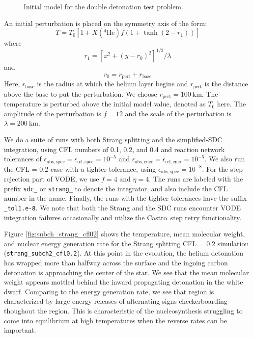 \documentclass[linenumbers]{aastex631}
\newcommand{\castro}{{\sf Castro}}
\newcommand{\isotm}[2]{{}^{#2}\mathrm{#1}}
\newcommand{\atolspec}{{\epsilon_\mathrm{abs,spec}}}
\newcommand{\rtolspec}{{\epsilon_\mathrm{rel,spec}}}
\newcommand{\atolener}{{\epsilon_\mathrm{abs,ener}}}
\newcommand{\rtolener}{{\epsilon_\mathrm{rel,ener}}}
\begin{document}
\begin{figure}[t]
\centering
{}
\caption{\label{fig:subch_initial_model} Initial model for the double detonation test problem.}
\end{figure}

An initial perturbation is placed on the symmetry axis of the form:
\begin{equation}
  T = T_0 \left [ 1 + X(\isotm{He}{4}) f (1 + \tanh(2 - r_1)) \right ]
\end{equation}
where
\begin{equation}
  r_1 = \left [ x^2 + (y - r_0)^2 \right ]^{1/2} / \lambda
\end{equation}
and
\begin{equation}
  r_0 = r_\mathrm{pert} + r_\mathrm{base}
\end{equation}
Here, $r_\mathrm{base}$ is the radius at which the helium layer begins
and $r_\mathrm{pert}$ is the distance above the base to put the perturbation.  We
choose $r_\mathrm{pert} = 100~\mathrm{km}$.  The temperature is perturbed above
the initial model value, denoted as $T_0$ here.  The amplitude of the perturbation
is $f = 12$ and the scale of the perturbation is $\lambda = 200~\mathrm{km}$.


We do a suite of runs with both Strang splitting and the simplified-SDC integration, using
CFL numbers of 0.1, 0.2, and 0.4 and reaction network tolerances of $\atolspec =
\rtolspec = 10^{-5}$ and $\atolener = \rtolener = 10^{-5}$.  We also run the CFL
= 0.2 case with a tighter tolerance, using  $\atolspec = 10^{-8}$.  For the step
rejection part of VODE, we use $f = 4$ and $\eta = 4$.  The runs are labeled with
the prefix {\tt sdc\_} or {\tt strang\_} to denote the integrator, and also include
the CFL number in the name.  Finally, the runs with the tighter tolerances have
the suffix {\tt \_tol1.e-8}.  We note that both the Strang and the SDC runs encounter
VODE integration failures occasionally and utilize the \castro\ step retry functionality.

Figure \ref{fig:subch_strang_cfl02} shows the temperature, mean
molecular weight, and nuclear energy generation rate for the Strang splitting
CFL = 0.2 simulation ({\tt strang\_subch2\_cfl0.2}).  At this point
in the evolution, the helium detonation has wrapped more than halfway
across the surface and the ingoing carbon detonation is approaching the
center of the star.  We see that the
mean molecular weight appears mottled behind the inward propagating
detonation in the white dwarf.  Comparing to the energy generation
rate, we see that region is characterized by large energy releases of
alternating signs checkerboarding thoughout the region.  This is
characteristic of the nucleosynthesis struggling to come into
equilibrium at high temperatures when the reverse rates can be
important.
\end{document}
